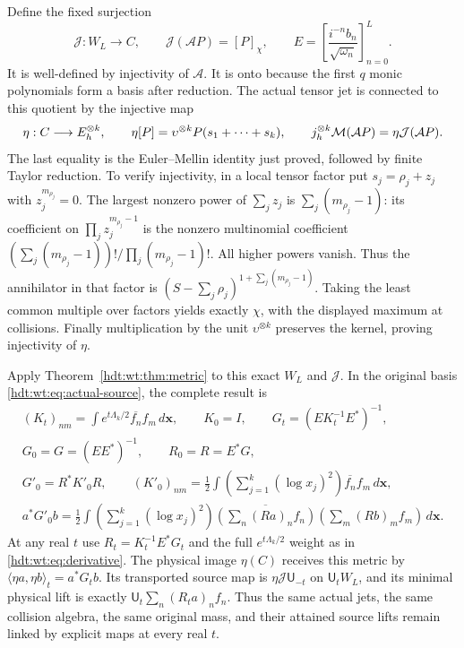 \documentclass[11pt]{article}
\begin{document}
Define the fixed surjection
\begin{equation}\label{hdt:wt:eq:actual-jet}
 \mathcal J:W_L\longrightarrow C,\qquad
 \mathcal J(\mathcal AP)=[P]_\chi,\qquad
 E=\left[\frac{i^{-n}b_n}{\sqrt{\omega_n}}\right]_{n=0}^L.
\end{equation}
It is well-defined by injectivity of $\mathcal A$.  It is onto
because the first $q$ monic polynomials form a basis after
reduction.  The actual tensor jet is connected to this quotient
by the injective map
\begin{equation}\label{hdt:wt:eq:eta}
 \eta:C\longrightarrow E_h^{\otimes k},\qquad
 \eta[P]=\upsilon^{\otimes k}P(s_1+\cdots+s_k),\qquad
 j_h^{\otimes k}\mathcal M(\mathcal AP)=\eta\mathcal J(\mathcal AP).
\end{equation}
The last equality is the Euler--Mellin identity just proved,
followed by finite Taylor reduction.  To verify injectivity,
in a local tensor factor put $s_j=\rho_j+z_j$ with
$z_j^{m_{\rho_j}}=0$.  The largest nonzero power of $\sum_jz_j$
is $\sum_j(m_{\rho_j}-1)$: its coefficient on
$\prod_jz_j^{m_{\rho_j}-1}$ is the nonzero multinomial
coefficient
$(\sum_j(m_{\rho_j}-1))!/\prod_j(m_{\rho_j}-1)!$.
All higher powers vanish.  Thus the annihilator in that factor
is $(S-\sum_j\rho_j)^{1+\sum_j(m_{\rho_j}-1)}$.
Taking the least common multiple over factors yields exactly
$\chi$, with the displayed maximum at collisions.  Finally
multiplication by the unit $\upsilon^{\otimes k}$ preserves
the kernel, proving injectivity of $\eta$.

Apply Theorem~\ref{hdt:wt:thm:metric} to this exact $W_L$ and
$\mathcal J$.  In the original basis \eqref{hdt:wt:eq:actual-source},
the complete result is
\begin{equation}\label{hdt:wt:eq:actual-derivative}
 \begin{gathered}
 (K_t)_{nm}=\int e^{t\Lambda_k/2}\overline{f_n}f_m\,d\mathbf x,
 \qquad K_0=I,\qquad
 G_t=(EK_t^{-1}E^*)^{-1},\\
 G_0=G=(EE^*)^{-1},\qquad R_0=R=E^*G,\\
 G'_0=R^*K'_0R,\qquad
 (K'_0)_{nm}=\frac12\int\left(\sum_{j=1}^k(\log x_j)^2\right)
                          \overline{f_n}f_m\,d\mathbf x,\\
 a^*G'_0b=\frac12\int\left(\sum_{j=1}^k(\log x_j)^2\right)
 \overline{\left(\sum_n(Ra)_nf_n\right)}
             \left(\sum_m(Rb)_mf_m\right)\,d\mathbf x.
 \end{gathered}
\end{equation}
At any real $t$ use $R_t=K_t^{-1}E^*G_t$ and the full
$e^{t\Lambda_k/2}$ weight as in \eqref{hdt:wt:eq:derivative}.
The physical image $\eta(C)$ receives this metric by
$\langle\eta a,\eta b\rangle_t=a^*G_tb$.  Its transported
source map is $\eta\mathcal J\mathsf U_{-t}$ on
$\mathsf U_tW_L$, and its minimal physical lift is exactly
$\mathsf U_t\sum_n(R_ta)_nf_n$.  Thus the same actual jets,
the same collision algebra, the same original mass, and their
attained source lifts remain linked by explicit maps at every
real $t$.
\end{document}
